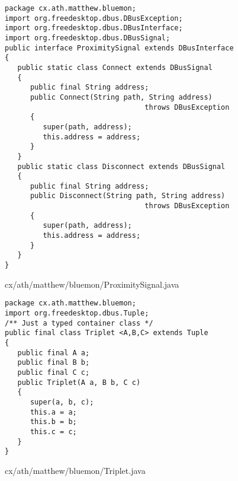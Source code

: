 \documentclass[a4paper,12pt]{article}
\begin{document}
\newpage

\begin{figure}[!h]
\begin{center}
\begin{verbatim}
package cx.ath.matthew.bluemon;
import org.freedesktop.dbus.DBusException;
import org.freedesktop.dbus.DBusInterface;
import org.freedesktop.dbus.DBusSignal;
public interface ProximitySignal extends DBusInterface
{
   public static class Connect extends DBusSignal
   {
      public final String address;
      public Connect(String path, String address) 
                                 throws DBusException
      {
         super(path, address);
         this.address = address;
      }
   }
   public static class Disconnect extends DBusSignal
   {
      public final String address;
      public Disconnect(String path, String address)
                                 throws DBusException
      {
         super(path, address);
         this.address = address;
      }
   }
}
\end{verbatim}
\end{center}
\caption{cx/ath/matthew/bluemon/ProximitySignal.java}
\end{figure}

\newpage

\begin{figure}[!h]
\begin{center}
\begin{verbatim}
package cx.ath.matthew.bluemon;
import org.freedesktop.dbus.Tuple;
/** Just a typed container class */
public final class Triplet <A,B,C> extends Tuple
{
   public final A a;
   public final B b;
   public final C c;
   public Triplet(A a, B b, C c)
   {
      super(a, b, c);
      this.a = a;
      this.b = b;
      this.c = c;
   }
}
\end{verbatim}
\end{center}
\caption{cx/ath/matthew/bluemon/Triplet.java}
\end{figure}

\newpage
\end{document}
